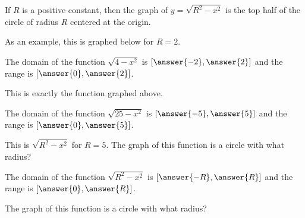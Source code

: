 \documentclass{ximera}
\author{Bobby Ramsey}
\begin{document}
	If $R$ is a positive constant, then the graph of $y= \sqrt{R^2 - x^2}$ is the top half of the circle of radius $R$ centered at the origin.
	
	As an example, this is graphed below for $R=2$.
	\begin{image}
	\end{image}

	\begin{exercise}	
		The domain of the function $\sqrt{4-x^2}$ is $[\answer{-2}, \answer{2}]$ and the range is $[\answer{0}, \answer{2}]$.
		\begin{hint}
			This is exactly the function graphed above.
		\end{hint}
		\begin{exercise}
			The domain of the function $\sqrt{25-x^2}$ is $[\answer{-5}, \answer{5}]$ and the range is $[\answer{0}, \answer{5}]$.
			\begin{hint}
				This is $\sqrt{R^2-x^2}$ for $R=5$. The graph of this function is a circle with what radius?
			\end{hint}
			\begin{exercise}
				The domain of the function $\sqrt{R^2-x^2}$ is $[\answer{-R}, \answer{R}]$ and the range is $[\answer{0}, \answer{R}]$.
				\begin{hint}
					The graph of this function is a circle with what radius?
				\end{hint}
			\end{exercise}
		\end{exercise}
	\end{exercise}
\end{document}

